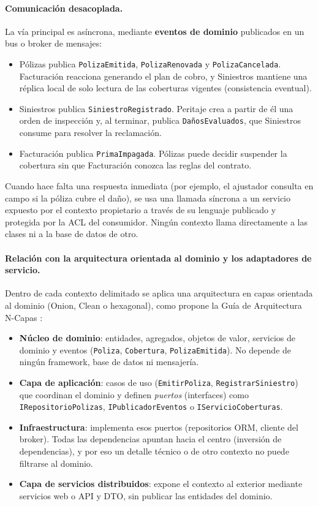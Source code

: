 \paragraph{Comunicación desacoplada.}
La vía principal es asíncrona, mediante \textbf{eventos de dominio} publicados en un bus o
broker de mensajes:
\begin{itemize}
  \item Pólizas publica \texttt{PolizaEmitida}, \texttt{PolizaRenovada} y
        \texttt{PolizaCancelada}. Facturación reacciona generando el plan de cobro, y
        Siniestros mantiene una réplica local de solo lectura de las coberturas vigentes
        (consistencia eventual).
  \item Siniestros publica \texttt{SiniestroRegistrado}. Peritaje crea a partir de él una
        orden de inspección y, al terminar, publica \texttt{DañosEvaluados}, que Siniestros
        consume para resolver la reclamación.
  \item Facturación publica \texttt{PrimaImpagada}. Pólizas puede decidir suspender la
        cobertura sin que Facturación conozca las reglas del contrato.
\end{itemize}
Cuando hace falta una respuesta inmediata (por ejemplo, el ajustador consulta en campo si la
póliza cubre el daño), se usa una llamada síncrona a un servicio expuesto por el contexto
propietario a través de su lenguaje publicado y protegida por la ACL del consumidor. Ningún
contexto llama directamente a las clases ni a la base de datos de otro.

\paragraph{Relación con la arquitectura orientada al dominio y los adaptadores de servicio.}
Dentro de cada contexto delimitado se aplica una arquitectura en capas orientada al dominio
(Onion, Clean o hexagonal), como propone la Guía de Arquitectura N-Capas
\parencite{torre2010guia}:
\begin{itemize}
  \item \textbf{Núcleo de dominio}: entidades, agregados, objetos de valor, servicios de
        dominio y eventos (\texttt{Poliza}, \texttt{Cobertura}, \texttt{PolizaEmitida}). No
        depende de ningún framework, base de datos ni mensajería.
  \item \textbf{Capa de aplicación}: casos de uso (\texttt{EmitirPoliza},
        \texttt{RegistrarSiniestro}) que coordinan el dominio y definen \emph{puertos}
        (interfaces) como \texttt{IRepositorioPolizas}, \texttt{IPublicadorEventos} o
        \texttt{IServicioCoberturas}.
  \item \textbf{Infraestructura}: implementa esos puertos (repositorios ORM, cliente del
        broker). Todas las dependencias apuntan hacia el centro (inversión de dependencias),
        y por eso un detalle técnico o de otro contexto no puede filtrarse al dominio.
  \item \textbf{Capa de servicios distribuidos}: expone el contexto al exterior mediante
        servicios web o API y DTO, sin publicar las entidades del dominio.
\end{itemize}

